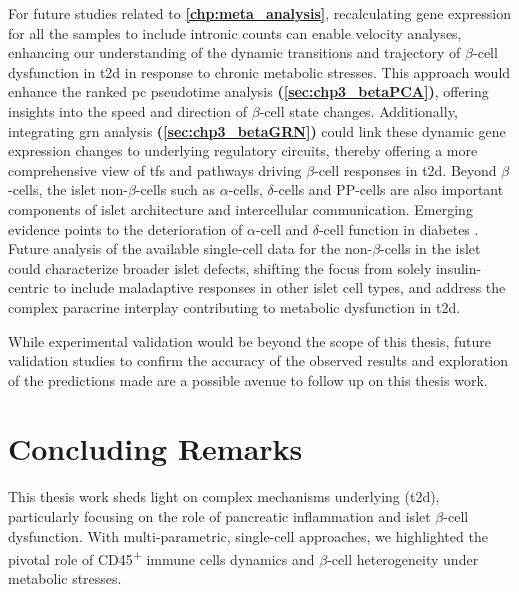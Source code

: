 \par For future studies related to \textbf{\autoref{chp:meta_analysis}}, recalculating gene expression for all the samples to include intronic counts can enable  velocity analyses, enhancing our understanding of the dynamic transitions and trajectory of $\beta$-cell dysfunction in \gls{t2d} in response to chronic metabolic stresses. This approach would enhance the ranked \gls{pc} pseudotime analysis \textbf{(\autoref{sec:chp3_betaPCA})}, offering insights into the speed and direction of $\beta$-cell state changes. Additionally, integrating \gls{grn} analysis \textbf{(\autoref{sec:chp3_betaGRN})} could link these dynamic gene expression changes to underlying regulatory circuits, thereby offering a more comprehensive view of \glspl{tf} and pathways driving $\beta$-cell responses in \gls{t2d}. Beyond $\beta$-cells, the islet non-$\beta$-cells such as $\alpha$-cells, $\delta$-cells and PP-cells are also important components of islet architecture and intercellular communication. Emerging evidence points to the deterioration of $\alpha$-cell and $\delta$-cell function in diabetes \textbf{\cite{brereton_alpha-_2015,gao_-cells_2021,brooks_not_2023}}. Future analysis of the available single-cell data for the non-$\beta$-cells in the islet could characterize broader islet defects, shifting the focus from solely insulin-centric to include maladaptive responses in other islet cell types, and address the complex paracrine interplay contributing to metabolic dysfunction in \gls{t2d}.\\

\par While experimental validation would be beyond the scope of this thesis, future validation studies to confirm the accuracy of the observed results and exploration of the predictions made are a possible avenue to follow up on this thesis work.

\clearpage

\section{Concluding Remarks}
\vspace{-5pt}
\par This thesis work sheds light on complex mechanisms underlying  (\gls{t2d}), particularly focusing on the role of pancreatic inflammation and islet $\beta$-cell dysfunction. With multi-parametric, single-cell approaches, we highlighted the pivotal role of CD45\textsuperscript{+} immune cells dynamics and $\beta$-cell heterogeneity under metabolic stresses.\\

